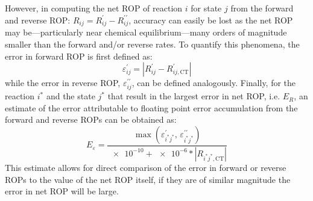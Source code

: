 \documentclass[12pt,number,sort&compress,preprint]{elsarticle}
\begin{document}
However, in computing the net ROP of reaction $i$ for state $j$ from the forward and reverse ROP: $R_{ij} = R_{ij}^{\prime} - R_{ij}^{\prime\prime}$, accuracy can easily be lost as the net ROP may be---particularly near chemical equilibrium---many orders of magnitude smaller than the forward and\slash or reverse rates.
To quantify this phenomena, the error in forward ROP is first defined as:
\begin{equation}
\varepsilon^{\prime}_{ij} = \left\lvert R_{ij}^{\prime} - R_{ij,\text{CT}}^{\prime} \right\rvert
\end{equation}
while the error in reverse ROP, $\varepsilon^{\prime\prime}_{ij}$, can be defined analogously.
Finally, for the reaction $i^{*}$ and the state $j^{*}$ that result in the largest error in net ROP, i.e. $E_{R}$, an estimate of the error attributable to floating point error accumulation from the forward and reverse ROPs can be obtained as:
\begin{equation}
E_{\varepsilon} = \frac{\max(\varepsilon^{\prime}_{i^{*}j^{*}}\text{, }\varepsilon^{\prime\prime}_{i^{*}j^{*}})}{\num{e-10} + \num{e-6} * \left\lvert R_{i^{*}j^{*},\text{CT}} \right\rvert}
\end{equation}
This estimate allows for direct comparison of the error in forward or reverse ROPs to the value of the net ROP itself, if they are of similar magnitude the error in net ROP will be large.
\end{document}
